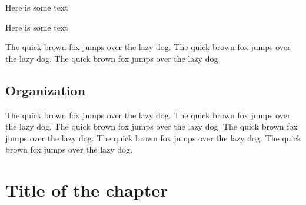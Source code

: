 \documentclass[11pt,a4paper]{report}
\begin{document}
\begin{tcolorbox}[width=.5\linewidth, halign=center, colframe=red, colback=blue!30, boxsep=5mm, arc=3mm]
Here is some text
\end{tcolorbox}

\begin{tcolorbox}[width=7cm, colframe=red, colback=blue!30, arc=3mm, sharp corners=east]
Here is some text
\end{tcolorbox}

The quick brown fox jumps over the lazy dog. The quick brown fox jumps over the lazy dog. The quick brown fox jumps over the lazy dog.

\section{Organization}
\label{sec:org}
The quick brown fox jumps over the lazy dog. The quick brown fox jumps over the lazy dog. The quick brown fox jumps over the lazy dog. The quick brown fox jumps over the lazy dog. The quick brown fox jumps over the lazy dog. The quick brown fox jumps over the lazy dog.

\chapter{Title of the chapter}
\label{cap:name1}
\end{document}
